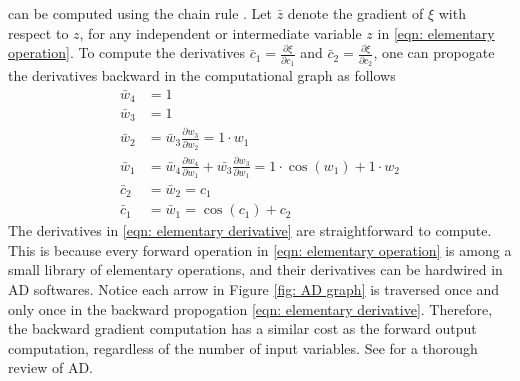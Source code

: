 can be computed using the chain rule \cite{AD review}. 
Let $\bar{z}$ 
denote the gradient of $\xi$ with respect to $z$, for any independent or intermediate
variable $z$ in \eqref{eqn: elementary operation}.
To compute the derivatives $\bar{c}_1 = \frac{\partial \xi}{\partial c_1}$ and
$\bar{c}_2 = \frac{\partial \xi}{\partial c_2}$,
one can propogate the derivatives backward in the computational graph as follows
\begin{equation}\begin{split}
    \bar{w}_4 & = 1\\
    \bar{w}_3& =1\\
    \bar{w}_2 & = \bar{w}_3 \frac{\partial w_3}{\partial w_2} = 1\cdot w_1\\
    \bar{w}_1 & = \bar{w}_4 \frac{\partial w_4}{\partial w_1} + \bar{w_3} 
                  \frac{\partial w_3}{\partial w_1} = 1\cdot \cos(w_1) +1\cdot w_2\\
    \bar{c}_2 &= \bar{w}_2 = c_1\\
    \bar{c}_1 &= \bar{w}_1 = \cos(c_1) + c_2
\end{split}
\label{eqn: elementary derivative}
\end{equation}
The derivatives in \eqref{eqn: elementary derivative} are straightforward to compute.
This is because every forward operation in \eqref{eqn: elementary operation} is among 
a small library of elementary operations, and
their derivatives can be hardwired in AD softwares. 
Notice each arrow in Figure \ref{fig: AD graph} is traversed once and only once in the backward propogation 
\eqref{eqn: elementary derivative}. Therefore, the backward
gradient computation has a similar cost as the forward output computation, regardless of
the number of input variables. 
See \cite{AD review} for a thorough review of AD.\\

